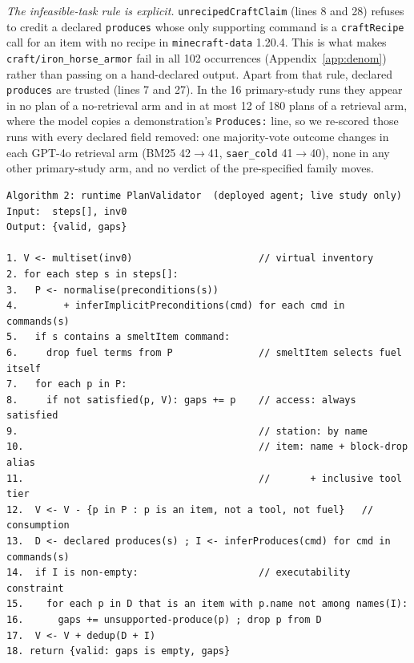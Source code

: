 \documentclass[letterpaper]{article} %
\newcommand{\appref}[1]{Appendix~\ref{#1}}
\begin{document}
\emph{The infeasible-task rule is explicit.}
\texttt{unrecipedCraftClaim} (lines 8 and 28) refuses to credit a
declared \texttt{produces} whose only supporting command is a
\texttt{craftRecipe} call for an item with no recipe in
\texttt{minecraft-data} 1.20.4.  This is what makes
\texttt{craft/iron\_horse\_armor} fail in all 102 occurrences
(\appref{app:denom}) rather than passing on a hand-declared
output.  Apart from that rule, declared \texttt{produces} are trusted (lines 7
and 27).  In the 16 primary-study runs they appear in no plan of a
no-retrieval arm and in at most 12 of 180 plans of a retrieval arm, where the
model copies a demonstration's \texttt{Produces:} line, so we re-scored those
runs with every declared field removed: one majority-vote outcome changes in
each GPT-4o retrieval arm (BM25 42$\to$41, \texttt{saer\_cold} 41$\to$40),
none in any other primary-study arm, and no verdict of the pre-specified
family moves.

\begin{footnotesize}
\begin{verbatim}
Algorithm 2: runtime PlanValidator  (deployed agent; live study only)
Input:  steps[], inv0
Output: {valid, gaps}

1. V <- multiset(inv0)                      // virtual inventory
2. for each step s in steps[]:
3.   P <- normalise(preconditions(s))
4.        + inferImplicitPreconditions(cmd) for each cmd in commands(s)
5.   if s contains a smeltItem command:
6.     drop fuel terms from P               // smeltItem selects fuel itself
7.   for each p in P:
8.     if not satisfied(p, V): gaps += p    // access: always satisfied
9.                                          // station: by name
10.                                         // item: name + block-drop alias
11.                                         //       + inclusive tool tier
12.  V <- V - {p in P : p is an item, not a tool, not fuel}   // consumption
13.  D <- declared produces(s) ; I <- inferProduces(cmd) for cmd in commands(s)
14.  if I is non-empty:                     // executability constraint
15.    for each p in D that is an item with p.name not among names(I):
16.      gaps += unsupported-produce(p) ; drop p from D
17.  V <- V + dedup(D + I)
18. return {valid: gaps is empty, gaps}
\end{verbatim}
\end{footnotesize}
\end{document}
